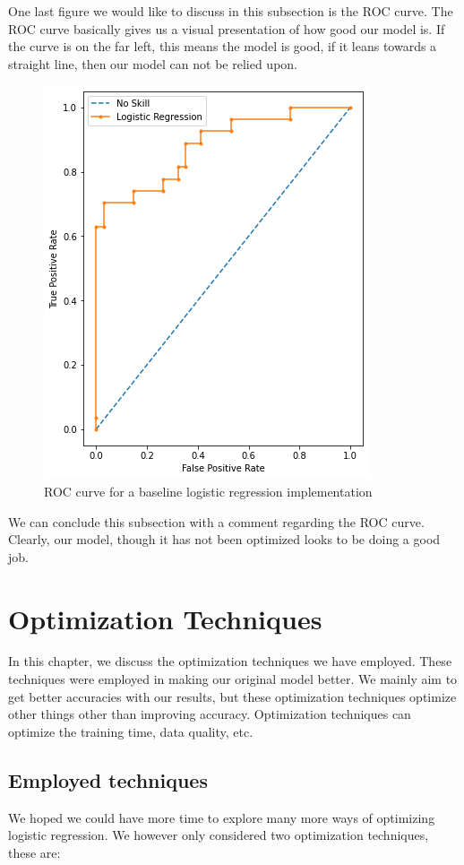 One last figure we would like to discuss in this subsection is the ROC curve. The ROC curve basically gives us a visual presentation of how good our model is. If the curve is on the far left, this means the model is good, if it leans towards a straight line, then our model can not be relied upon.
\begin{figure}[H]
    \begin{center}
        \includegraphics[scale=0.5]{Images/logROC.png}
    \end{center}
    \caption{ROC curve for a baseline logistic regression implementation}
\end{figure}
We can conclude this subsection with a comment regarding the ROC curve. Clearly, our model, though it has not been optimized looks to be doing a good job.


\section{Optimization Techniques}
In this chapter, we discuss the optimization techniques we have employed. These techniques were employed in making our original model better. We mainly aim to get better accuracies with our results, but these optimization techniques optimize other things other than improving accuracy. Optimization techniques can optimize the training time, data quality, etc.

\subsection{Employed techniques}
We hoped we could have more time to explore many more ways of optimizing logistic regression. We however only considered two optimization techniques, these are:

